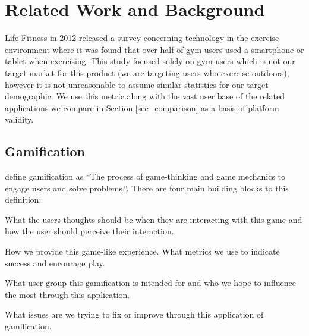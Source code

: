 \chapter{Related Work and Background}\label{ch_background}

Life Fitness in 2012 released a survey concerning technology in the
exercise environment\cite{lifefitness} where it was found that over
half of gym users used a smartphone or tablet when exercising. This
study focused solely on gym users which is not our target market for
this product (we are targeting users who exercise outdoors), however
it is not unreasonable to assume similar statistics for our target
demographic. We use this metric along with the vast user base of the
related applications we compare in Section \ref{sec_comparison} as a
basis of platform validity. 

\section{Gamification}
\citet{gamification_book} define gamification as ``The process of
game-thinking and game mechanics to engage users and solve
problems.''. There are four main building blocks to this definition:

\begin{description}[style=multiline, leftmargin=3cm]
\item[\emph{game-thinking}] What the users thoughts should be when
  they are interacting with this game and how the user should perceive
  their interaction.
\item[\emph{game mechanics}] How we provide this game-like
  experience. What metrics we use to indicate success and encourage
  play. 
\item[\emph{users}] What user group this gamification is intended for
  and who we hope to influence the most through this application.
\item[\emph{problems}] What issues are we trying to fix or improve
  through this application of gamification.
\end{description}

